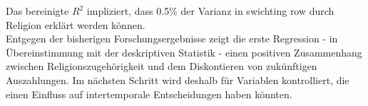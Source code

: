 \documentclass[11pt,a4paper]{article}
\begin{document}
Das bereinigte $R^2$ impliziert, dass 0.5\% der Varianz in swichting row durch Religion erklärt werden können.\\


Entgegen der bisherigen Forschungsergebnisse zeigt die erste Regression - in Übereinstimmung mit der deskriptiven Statistik - einen positiven Zusammenhang zwischen Religionszugehörigkeit und dem Diskontieren von zukünftigen Auszahlungen. Im nächsten Schritt wird deshalb für Variablen kontrolliert, die einen Einfluss auf intertemporale Entscheidungen haben könnten. 

\end{document}
